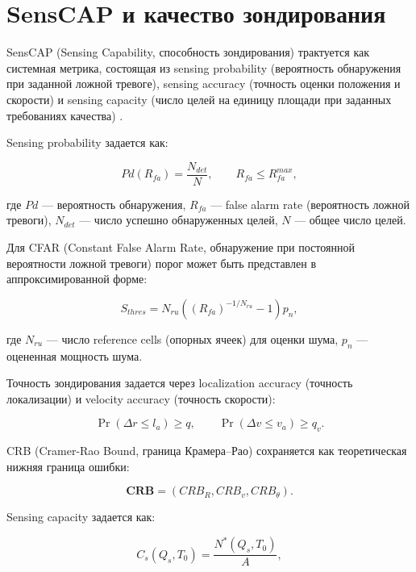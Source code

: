 \documentclass[12pt,a4paper]{article}
\begin{document}
\section{SensCAP и качество зондирования}

SensCAP (Sensing Capability, способность зондирования) трактуется как системная метрика, состоящая из sensing probability (вероятность обнаружения при заданной ложной тревоге), sensing accuracy (точность оценки положения и скорости) и sensing capacity (число целей на единицу площади при заданных требованиях качества) \cite{liu2024senscap,liu2026cooperative}.

Sensing probability задается как:

\begin{equation}
Pd(R_{fa})=\frac{N_{det}}{N},
\qquad
R_{fa}\le R_{fa}^{max},
\end{equation}

где $Pd$ --- вероятность обнаружения, $R_{fa}$ --- false alarm rate (вероятность ложной тревоги), $N_{det}$ --- число успешно обнаруженных целей, $N$ --- общее число целей.

Для CFAR (Constant False Alarm Rate, обнаружение при постоянной вероятности ложной тревоги) порог может быть представлен в аппроксимированной форме:

\begin{equation}
S_{thres}
=
N_{ru}
\left((R_{fa})^{-1/N_{ru}}-1\right)p_n,
\end{equation}

где $N_{ru}$ --- число reference cells (опорных ячеек) для оценки шума, $p_n$ --- оцененная мощность шума.

Точность зондирования задается через localization accuracy (точность локализации) и velocity accuracy (точность скорости):

\begin{equation}
\Pr(\Delta r\le l_a)\ge q,
\qquad
\Pr(\Delta v\le v_a)\ge q_v.
\end{equation}

CRB (Cramer-Rao Bound, граница Крамера--Рао) сохраняется как теоретическая нижняя граница ошибки:

\begin{equation}
\mathbf{CRB}=(CRB_R,CRB_v,CRB_\theta).
\end{equation}

Sensing capacity задается как:

\begin{equation}
C_s(Q_s,T_0)=\frac{N^*(Q_s,T_0)}{A},
\end{equation}
\end{document}

